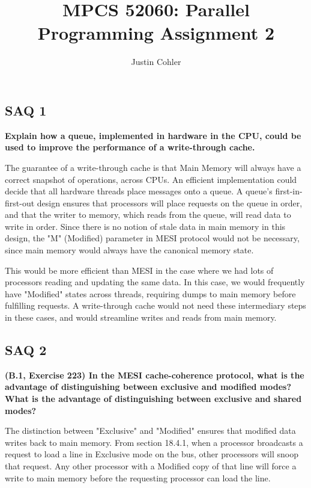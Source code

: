 \documentclass[12pt]{article}
\begin{document}
\title{MPCS 52060: Parallel Programming Assignment 2}
\author{Justin Cohler}

\maketitle

\subsection*{SAQ 1} 
\textbf{Explain how a queue, implemented in hardware in the CPU, could be used to improve the performance of a write-through cache.}

\vspace{5mm}

The guarantee of a write-through cache is that Main Memory will always have a correct snapshot of operations, across CPUs. An efficient implementation could decide that all hardware threads place messages onto a queue. A queue's first-in-first-out design ensures that processors will place requests on the queue in order, and that the writer to memory, which reads from the queue, will read data to write in order. Since there is no notion of stale data in main memory in this design, the "M" (Modified) parameter in MESI protocol would not be necessary, since main memory would always have the canonical memory state.

This would be more efficient than MESI in the case where we had lots of processors reading and updating the same data. In this case, we would frequently have "Modified" states across threads, requiring dumps to main memory before fulfilling requests. A write-through cache would not need these intermediary steps in these cases, and would streamline writes and reads from main memory.

\subsection*{SAQ 2}
\textbf{(B.1, Exercise 223) In the MESI cache-coherence protocol, what is the advantage of distinguishing between exclusive and modified modes? What is the advantage of distinguishing between exclusive and shared modes?}

\vspace{5mm}

The distinction between "Exclusive" and "Modified" ensures that modified data writes back to main memory. From section 18.4.1, when a processor broadcasts a request to load a line in Exclusive mode on the bus, other processors will snoop that request. Any other processor with a Modified copy of that line will force a write to main memory before the requesting processor can load the line. 
\end{document}
